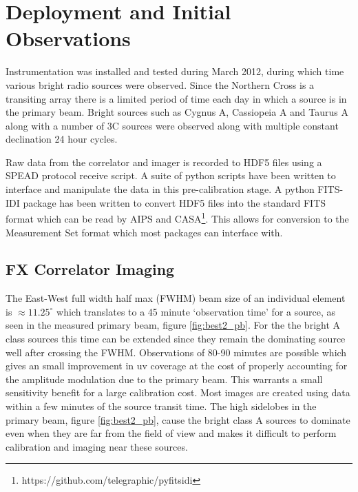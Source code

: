 \documentclass[useAMS,macros,usenatbib]{mn2e}
\begin{document}
\section{Deployment and Initial Observations}
\label{observations}

Instrumentation was installed and tested during March 2012, during which time various bright radio sources were observed.
Since the Northern Cross is a transiting array there is a limited period of time each day in which a source is in the primary beam.
Bright sources such as Cygnus A, Cassiopeia A and Taurus A along with a number of 3C sources were observed along with multiple constant declination 24 hour cycles.

Raw data from the correlator and imager is recorded to HDF5 files using a SPEAD protocol receive script.
A suite of python scripts have been written to interface and manipulate the data in this pre-calibration stage.
A python FITS-IDI package has been written to convert HDF5 files into the standard FITS format which can be read by AIPS and CASA\footnote{https://github.com/telegraphic/pyfitsidi}.
This allows for conversion to the Measurement Set format which most packages can interface with.

\subsection{FX Correlator Imaging}
\label{fx_results}


The East-West full width half max (FWHM) beam size of an individual element is $\approx11.25^{\circ}$ which translates to a 45 minute `observation time' for a source, as seen in the measured primary beam, figure \ref{fig:best2_pb}.
For the the bright A class sources this time can be extended since they remain the dominating source well after crossing the FWHM.
Observations of 80-90 minutes are possible which gives an small improvement in uv coverage at the cost of properly accounting for the amplitude modulation due to the primary beam.
This warrants a small sensitivity benefit for a large calibration cost.
Most images are created using data within a few minutes of the source transit time.
The high sidelobes in the primary beam, figure \ref{fig:best2_pb}, cause the bright class A sources to dominate even when they are far from the field of view and makes it difficult to perform calibration and imaging near these sources.
\end{document}
